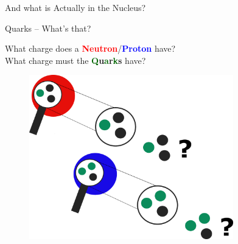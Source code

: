 \begin{frame}[t]{And what is Actually in the Nucleus?}
\end{frame}


\begin{frame}{Quarks -- What's that?}

    \begin{minipage}[t]{\linewidth}\raggedleft
           What charge does a \textcolor{red}{\textbf{Neutron}}/\textcolor{blue}{\textbf{Proton}} have? \\
           What charge must the \textcolor{darkgreen}{\textbf{Q}}\textbf{u}\textcolor{darkgreen}{\textbf{a}}\textbf{r}\textcolor{darkgreen}{\textbf{k}}\textbf{s} have?
    \end{minipage}%
    \vspace{-0.6cm}
    \begin{minipage}{\linewidth}\raggedright
        \begin{figure}[htb]
            \includegraphics[width=0.79\textwidth]{Figures Introductory Lecture/Standard Model/Quarks.png}
            \label{fig:quarks}
        \end{figure}            
    \end{minipage}
    
\end{frame}


